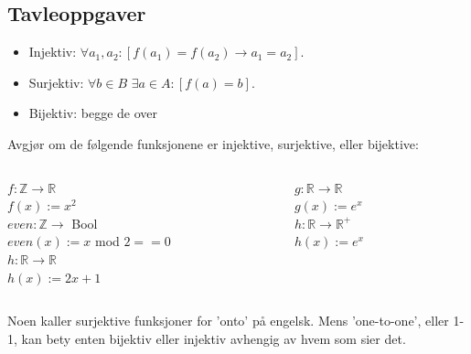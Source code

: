 \subsection{Tavleoppgaver}
\begin{frame} %
    \begin{itemize}
        \item Injektiv:  $\forall a_1, a_2 : [f(a_1) = f(a_2) \rightarrow a_1 = a_2]$.\\
        \item Surjektiv: $\forall b \in B$  $\exists a \in A : [f(a) = b]$.\\
        \item Bijektiv: begge de over \\
    \end{itemize}
    \pause
    \begin{block}{Avgjør om de følgende funksjonene er injektive, surjektive, eller bijektive:}
        \begin{columns}
            \begin{column}{0.45\textwidth}
                $f : \mathbb{Z} \rightarrow \mathbb{R}$\\
                $f(x) := x^2$\\[1mm]
                $even : \mathbb{Z} \rightarrow $ Bool\\
                $even(x) := x$ mod $2 == 0$\\[1mm]
                \pause
                $h : \mathbb{R} \rightarrow \mathbb{R}$\\
                $h(x) := 2x + 1$\\[1mm]
            \end{column}
            \pause
            \begin{column}{0.45\textwidth}
                $g : \mathbb{R} \rightarrow \mathbb{R}$\\
                $g(x) := e^x$\\[1mm]
                \pause
                $h : \mathbb{R} \rightarrow \mathbb{R}^+$\\
                $h(x) := e^x$
            \end{column}
        \end{columns}
    \end{block}
    \pause
    Noen kaller surjektive funksjoner for 'onto' på engelsk. Mens 'one-to-one', eller 1-1, kan bety enten bijektiv eller injektiv avhengig av hvem som sier det.
\end{frame}